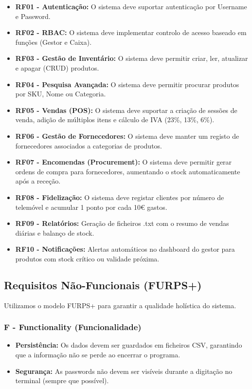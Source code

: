 \documentclass[runningheads,a4paper]{llncs}
\begin{document}
\begin{itemize}
    \item \textbf{RF01 - Autenticação:} O sistema deve suportar autenticação por Username e Password.
    \item \textbf{RF02 - RBAC:} O sistema deve implementar controlo de acesso baseado em funções (Gestor e Caixa).
    \item \textbf{RF03 - Gestão de Inventário:} O sistema deve permitir criar, ler, atualizar e apagar (CRUD) produtos.
    \item \textbf{RF04 - Pesquisa Avançada:} O sistema deve permitir procurar produtos por SKU, Nome ou Categoria.
    \item \textbf{RF05 - Vendas (POS):} O sistema deve suportar a criação de sessões de venda, adição de múltiplos itens e cálculo de IVA (23\%, 13\%, 6\%).
    \item \textbf{RF06 - Gestão de Fornecedores:} O sistema deve manter um registo de fornecedores associados a categorias de produtos.
    \item \textbf{RF07 - Encomendas (Procurement):} O sistema deve permitir gerar ordens de compra para fornecedores, aumentando o stock automaticamente após a receção.
    \item \textbf{RF08 - Fidelização:} O sistema deve registar clientes por número de telemóvel e acumular 1 ponto por cada 10€ gastos.
    \item \textbf{RF09 - Relatórios:} Geração de ficheiros .txt com o resumo de vendas diárias e balanço de stock.
    \item \textbf{RF10 - Notificações:} Alertas automáticos no dashboard do gestor para produtos com stock crítico ou validade próxima.
\end{itemize}

\subsection{Requisitos Não-Funcionais (FURPS+)}
Utilizamos o modelo FURPS+ para garantir a qualidade holística do sistema.

\subsubsection{F - Functionality (Funcionalidade)}
\begin{itemize}
    \item \textbf{Persistência:} Os dados devem ser guardados em ficheiros CSV, garantindo que a informação não se perde ao encerrar o programa.
    \item \textbf{Segurança:} As passwords não devem ser visíveis durante a digitação no terminal (sempre que possível).
\end{itemize}
\end{document}
